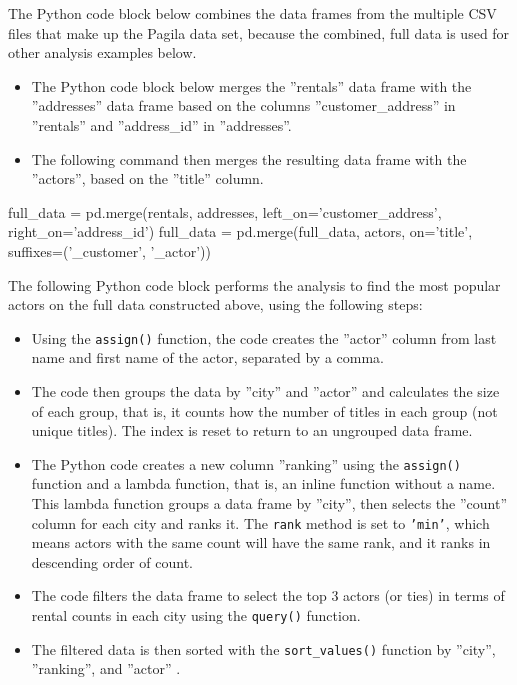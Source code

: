 The Python code block below combines the data frames from the multiple CSV files that make up the Pagila data set, because the combined, full data is used for other analysis examples below.

\begin{itemize} 
\item The Python code block below merges the ''rentals'' data frame with the ''addresses'' data frame based on the columns ''customer\_address'' in ''rentals'' and ''address\_id'' in ''addresses''.
\item The following command then merges the resulting data frame with the ''actors'', based on the ''title'' column. 
\end{itemize}

\begin{samepage}
\begin{pythoncode}
full_data = pd.merge(rentals, addresses, 
                     left_on='customer_address', 
                     right_on='address_id')
full_data = pd.merge(full_data, actors, on='title', 
                     suffixes=('_customer', '_actor'))
\end{pythoncode}
\end{samepage}

The following Python code block performs the analysis to find the most popular actors on the full data constructed above, using the following steps:

\begin{itemize}
\item Using the \texttt{assign()} function, the code creates the ''actor'' column from last name and first name of the actor, separated by a comma.
\item The code then groups the data by ''city'' and ''actor'' and calculates the size of each group, that is, it counts how the number of titles in each group (not unique titles). The index is reset to return to an ungrouped data frame.
\item The Python code creates a new column ''ranking'' using the \texttt{assign()} function and a lambda function, that is, an inline function without a name. This lambda function groups a data frame by ''city'', then selects the ''count'' column for each city and ranks it. The \texttt{rank} method is set to \texttt{'min'}, which means actors with the same count will have the same rank, and it ranks in descending order of count.
\item The code filters the data frame to select the top 3 actors (or ties) in terms of rental counts in each city using the \texttt{query()} function.
\item The filtered data is then sorted with the \texttt{sort\_values()} function by ''city'', ''ranking'', and ''actor'' .
\end{itemize}


